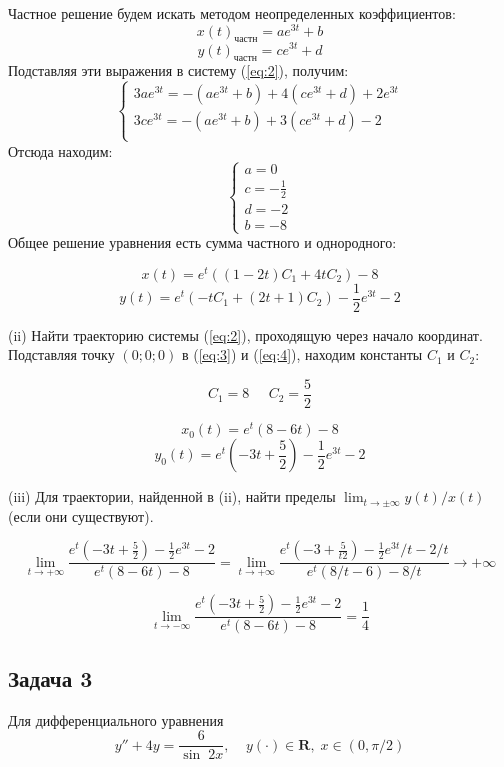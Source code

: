 \documentclass[a4paper, 12pt]{article}
\begin{document}
Частное решение будем искать методом неопределенных коэффициентов:
\[x(t)_{\text{частн}}=ae^{3t}+b\]
\[y(t)_{\text{частн}}=ce^{3t}+d\]
Подставляя эти выражения в систему (\ref{eq:2}), получим:
\[
\left\{
\begin{array}{lr}
3ae^{3t}=-(ae^{3t}+b)+4(ce^{3t}+d)+2e^{3t}\\
3ce^{3t}=-(ae^{3t}+b)+3(ce^{3t}+d)-2\\
\end{array}
\right.
\]
Отсюда находим:
\[
\left\{
\begin{array}{lr}
a = 0\\
c = - \frac 1 2 \\
d = -2 \\
b=-8
\end{array}
\right.
\]
Общее решение уравнения есть сумма частного и однородного:

\begin{equation}
x(t) = e^t\left(\left(1-2t\right)C_1+4tC_2\right)-8
\label{eq:3}
\end{equation}
\begin{equation}
y(t) = e^t\left(-tC_1+\left(2t+1\right)C_2\right)-\frac 1 2 e^{3t}-2
\label{eq:4}
\end{equation}

(ii) Найти траекторию системы (\ref{eq:2}), проходящую через начало координат.\\
Подставляя точку $(0;0;0)$ в (\ref{eq:3}) и (\ref{eq:4}), находим константы $C_1$ и $C_2$:

\[C_1 =8\;\;\;\;\; C_2 = \frac 5 2\]

\[
x_0(t) = e^t\left(8-6t\right)-8\]\[
y_0(t) = e^t\left(-3t+\frac 5 2\right)- \frac 1 2 e^{3t} - 2
\]

(iii) Для траектории, найденной в (ii), найти пределы $\lim_{t\rightarrow\pm\infty}y(t)/x(t)$ (если они существуют).


\[\lim_{t\rightarrow+\infty}\frac{e^t\left(-3t+\frac 5 2\right)- \frac 1 2 e^{3t} - 2}{ e^t\left(8-6t\right)-8}=\lim_{t\rightarrow+\infty}\frac{e^t\left(-3+\frac 5 {t2}\right)- \frac 1 2 e^{3t}/t - 2/t}{ e^t\left(8/t-6\right)-8/t}\rightarrow+\infty\]

\[\lim_{t\rightarrow-\infty}\frac{e^t\left(-3t+\frac 5 2\right)- \frac 1 2 e^{3t} - 2}{ e^t\left(8-6t\right)-8}=\frac{1}{4}\]


	\subsection {Задача 3}
Для дифференциального уравнения 
\begin{equation}
y''+4y=\frac{6}{\sin\;2x}, \;\;\;\; y(\cdot)\in \textbf{R},\; x\in (0, \pi/2)
\label{eq:5}
\end{equation}
\end{document}
